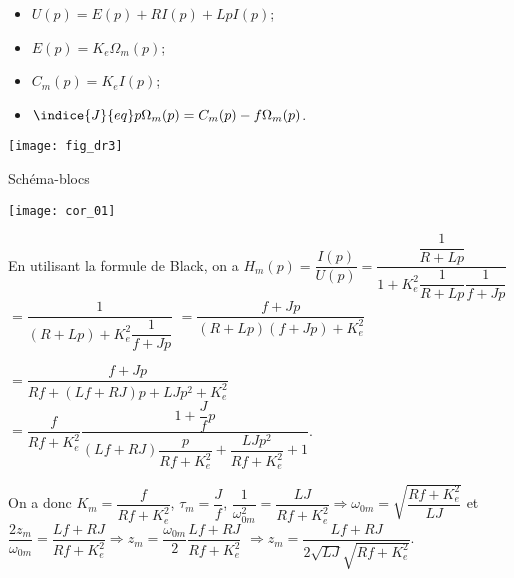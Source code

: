 \ifprof
\begin{corrige}
\begin{itemize}
\item $U(p) = E(p)+RI(p)+Lp I(p)$;
\item $E(p)=K_e\Omega_m(p)$;
\item $C_m(p)=K_e I(p)$;
\item $\indice{J}{eq} p\Omega_m(p) = C_m(p)-f\Omega_m(p)$.
\end{itemize}
\end{corrige}
\else
\fi

\ifprof
\else
\begin{marginfigure}
\centering
\texttt{[image: fig\_dr3]}
\caption{Schéma-blocs \label{fig_dr3}}
\end{marginfigure}
\fi


\ifprof
\begin{corrige}
\begin{center}
\texttt{[image: cor\_01]}
\end{center}
\end{corrige}
\else
\fi


\ifprof
\begin{corrige}
En utilisant la formule de Black, on a 
$H_m(p)=\dfrac{I(p)}{U(p)} = \dfrac{\dfrac{1}{R+Lp}}{1+K_e^2 \dfrac{1}{R+Lp} \dfrac{1}{f+Jp}}$
$ = \dfrac{1}{\left(R+Lp\right)+K_e^2 \dfrac{1}{f+Jp}}$
$ = \dfrac{f+Jp}{\left(R+Lp\right)\left(f+Jp\right)+K_e^2 }$

$ = \dfrac{f+Jp}{Rf+\left(Lf + RJ\right)p+LJp^2 +K_e^2 }$
$ = \dfrac{f}{Rf+K_e^2} \dfrac{1+\dfrac{J}{f}p}{\left(Lf + RJ\right)\dfrac{p}{Rf+K_e^2}+\dfrac{LJp^2}{Rf+K_e^2}+1 }$.

On a donc $K_m = \dfrac{f}{Rf+K_e^2}$, $\tau_m=\dfrac{J}{f}$, 
$\dfrac{1}{\omega_{0m}^2} = \dfrac{LJ}{Rf+K_e^2} \Rightarrow \omega_{0m} = \sqrt{\dfrac{Rf+K_e^2}{LJ}} $
et $ \dfrac{2z_m}{\omega_{0m}} = \dfrac{Lf + RJ}{Rf+K_e^2} \Rightarrow z_m = \dfrac{\omega_{0m}}{2}\dfrac{Lf + RJ}{Rf+K_e^2}$
$\Rightarrow z_m = \dfrac{Lf + RJ}{2\sqrt{LJ}\sqrt{Rf+K_e^2}}$.

\end{corrige}
\else
\fi


